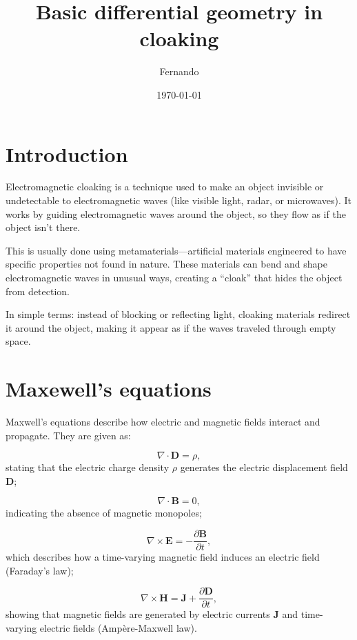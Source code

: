 \documentclass{amsart}
\begin{document}
\newcommand{\R}{\mathbb{R}}
\newcommand\tbf[1]{\textbf{#1}}
\newcommand\myworries[1]{\textcolor{red}{\tbf{#1}}}

\title{Basic differential geometry in cloaking}
\author{Fernando}
\date{\today}
\maketitle

\section{Introduction}
Electromagnetic cloaking is a technique used to make an object invisible or undetectable to electromagnetic waves (like visible light, radar, or microwaves). It works by guiding electromagnetic waves around the object, so they flow as if the object isn’t there.

This is usually done using metamaterials—artificial materials engineered to have specific properties not found in nature. These materials can bend and shape electromagnetic waves in unusual ways, creating a “cloak” that hides the object from detection.

In simple terms: instead of blocking or reflecting light, cloaking materials redirect it around the object, making it appear as if the waves traveled through empty space.

\section{Maxewell's equations}

Maxwell's equations describe how electric and magnetic fields interact and propagate.
They are given as:

\[
\nabla \cdot \mathbf{D} = \rho,
\]
stating that the electric charge density \(\rho\) generates the electric displacement field \(\mathbf{D}\);

\[
\nabla \cdot \mathbf{B} = 0,
\]
indicating the absence of magnetic monopoles;

\[
\nabla \times \mathbf{E} = -\frac{\partial \mathbf{B}}{\partial t},
\]
which describes how a time-varying magnetic field induces an electric field (Faraday's law);

\[
\nabla \times \mathbf{H} = \mathbf{J} + \frac{\partial \mathbf{D}}{\partial t},
\]
showing that magnetic fields are generated by electric currents \(\mathbf{J}\) 
and time-varying electric fields (Ampère-Maxwell law).
\end{document}
